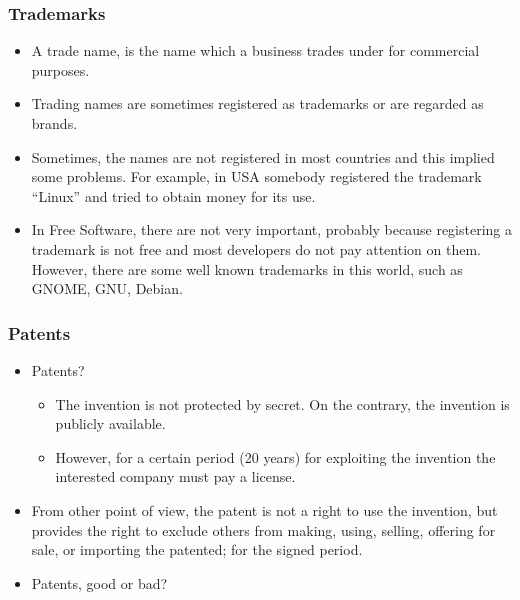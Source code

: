 \begin{frame}
\frametitle{Trademarks}

\begin{itemize}
\item A trade name, is the name which a business trades under for commercial
purposes.

\item Trading names are sometimes registered as trademarks or are regarded
as brands.

\item Sometimes, the names are not registered in most countries and this
implied some problems. For example, in USA somebody registered the
trademark ``Linux'' and tried to obtain money for its use.

\item In Free Software, there are not very important, probably because
registering a trademark is not free and most developers do not pay
attention on them. However, there are some well known trademarks in
this world, such as GNOME, GNU, Debian.

\end{itemize}

\end{frame}




\begin{frame}
\frametitle{Patents}

\begin{itemize}
\item Patents?
\begin{itemize}
\item The invention is not protected by secret. On the contrary, the
  invention is publicly available.
\item However, for a certain period (20 years) for
  exploiting the invention the interested company must pay a license.
\end{itemize}

\item From other point of view, the patent is not a right to use the
invention, but provides the right to exclude others from making,
using, selling, offering for sale, or importing the patented; for the
signed period.

\item Patents, good or bad?
\end{itemize}

\end{frame}


